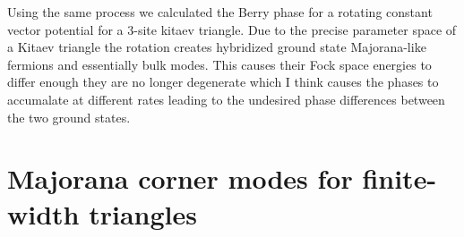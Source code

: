 \documentclass[aps,prb,showpacs,amsmath,amssymb,superscriptaddress]{revtex4-2}
\begin{document}
Using the same process we calculated the Berry phase for a rotating constant vector potential for a 3-site kitaev triangle.
Due to the precise parameter space of a Kitaev triangle the rotation creates hybridized ground state Majorana-like fermions and essentially bulk modes.
This causes their Fock space energies to differ enough they are no longer degenerate which I think causes the phases to accumalate at different rates leading to the undesired phase differences between the two ground states.


\section{Majorana corner modes for finite-width triangles}

\begin{figure}
  \hspace{28pt}
   \\
  \vspace{-20pt}
   \\
  \hspace{70pt}

\end{figure}
\end{document}

